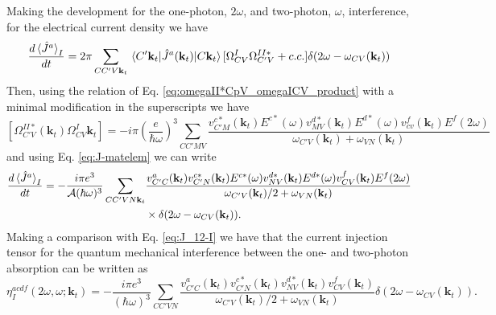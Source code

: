 \documentclass{article}
\newcommand{\kt}{\mathbf{k}_{t}}
\begin{document}
Making the development for the one-photon, $2\omega$, and two-photon, $\omega$,
interference, for the electrical current density we have 
\begin{equation*}
\frac{d\ev*{\hat{J}^{a}}_{I}}{dt} = 2 \pi \sum_{CC'V\kt} \mel{C'\kt}
{\hat{J}^{a}(\kt)}{C\kt} [\Omega^{I}_{CV} \Omega^{II*}_{C'V} + c.c.]
\delta(2\omega - \omega_{CV}(\kt))
\end{equation*}
Then, using the relation of Eq. \eqref{eq:omegaII*CpV_omegaICV_product} with a
minimal modification in the superscripts we have
\begin{equation}\label{eq:omegaII*CpV_omegaICV_product-2}
[\Omega^{II*}_{C'V}(\kt) \Omega^{I}_{CV}{\kt}] =  -i \pi \left( \frac{e}
{\hbar\omega} \right)^{3} \sum_{CC'MV} \frac{v^{c*}_{C'M}(\kt) E^{c*}(\omega)
v^{d*}_{MV}(\kt) E^{d*}(\omega) v^{f}_{cv}(\kt) E^{f}(2\omega) }
{\omega_{C'V}(\kt)+\omega_{VN}(\kt)}
\end{equation}
and using Eq. \eqref{eq:J-matelem} we can write
\begin{equation*}
\begin{split}
\frac{d\ev*{\hat{J}^{a}}_{I}}{dt} = - \frac{i \pi e^{3}}{\mathcal{A}(\hbar 
\omega)^{3}}\sum_{CC'VN\kt} & \frac{v^{a}_{C'C}(\kt) v^{c*}_{C'N}(\kt) 
E^{c*}(\omega) v^{d*}_{NV}(\kt) E^{d*}(\omega) v^{f}_{CV}(\kt) E^{f}(2\omega) }
{\omega_{C'V}(\kt)/2 + \omega_{VN}(\kt)} \\
& \times \delta(2\omega - \omega_{CV}(\kt)) .
\end{split}
\end{equation*}
Making a comparison with Eq. \eqref{eq:J_12-I} we have that the current
injection tensor for the quantum mechanical interference between the one- and
two-photon absorption can be written as
\begin{equation}
\eta^{acdf}_{I}(2\omega,\omega;\kt) = - \frac{i \pi e^{3}}{(\hbar \omega)^{3}}
\sum_{CC'VN} \frac{v^{a}_{C'C}(\kt) v^{c*}_{C'N}(\kt) v^{d*}_{NV}(\kt) 
v^{f}_{CV}(\kt)}{\omega_{C'V}(\kt)/2 + \omega_{VN}(\kt)} \delta(2\omega - 
\omega_{CV}(\kt)) .
\end{equation}
\end{document}
